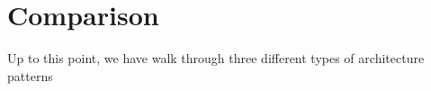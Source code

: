 

\section{Comparison}
Up to this point, we have walk through three different types of architecture patterns


% 




